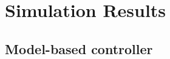 %
%
%
%




\newpage
\section{Simulation Results}
\label{sec:shift_sim}


\subsection{Model-based controller}

